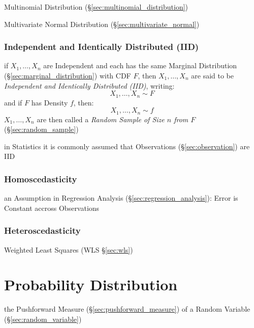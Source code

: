 Multinomial Distribution (\S\ref{sec:multinomial_distribution})

Multivariate Normal Distribution (\S\ref{sec:multivariate_normal})



\subsubsection{Independent and Identically Distributed (IID)}\label{sec:iid}

if $X_1, \ldots, X_n$ are Independent and each has the same Marginal
Distribution (\S\ref{sec:marginal_distribution}) with CDF $F$, then $X_1,
\ldots, X_n$ are said to be \emph{Independent and Identically Distributed
  (IID)}, writing:
\[
  X_1, \ldots, X_n \sim F
\]
and if $F$ has Density $f$, then:
\[
  X_1, \ldots, X_n \sim f
\]
$X_1, \ldots, X_n$ are then called a \emph{Random Sample of Size $n$ from $F$}
(\S\ref{sec:random_sample})

in Statistics it is commonly assumed that Observations (\S\ref{sec:observation})
are IID



\subsubsection{Homoscedasticity}\label{sec:homoscedasticity}

an Assumption in Regression Analysis (\S\ref{sec:regression_analysis}): Error is
Constant accross Observations



\subsubsection{Heteroscedasticity}\label{sec:heteroscedasticity}

Weighted Least Squares (WLS \S\ref{sec:wls})



\section{Probability Distribution}\label{sec:probability_distribution}

the Pushforward Measure (\S\ref{sec:pushforward_measure}) of a Random Variable
(\S\ref{sec:random_variable})

